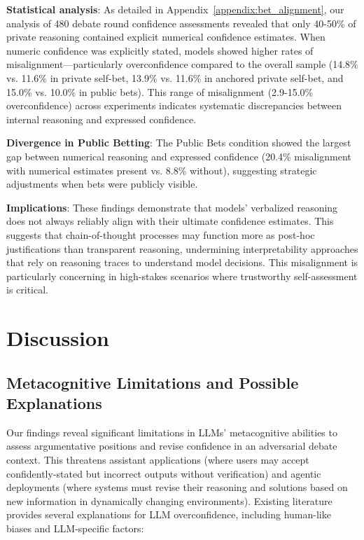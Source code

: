 \documentclass{article}
\begin{document}
\textbf{Statistical analysis}: As detailed in Appendix~\ref{appendix:bet_alignment}, our analysis of 480 debate round confidence assessments revealed that only 40-50\% of private reasoning contained explicit numerical confidence estimates. When numeric confidence was explicitly stated, models showed higher rates of misalignment—particularly overconfidence compared to the overall sample (14.8\% vs. 11.6\% in private self-bet, 13.9\% vs. 11.6\% in anchored private self-bet, and 15.0\% vs. 10.0\% in public bets). This range of misalignment (2.9-15.0\% overconfidence) across experiments indicates systematic discrepancies between internal reasoning 
and expressed confidence.

\textbf{Divergence in Public Betting}: The Public Bets condition showed the largest gap between numerical reasoning and expressed confidence (20.4\% misalignment with numerical estimates present vs. 8.8\% without), suggesting strategic adjustments when bets were publicly visible.

\textbf{Implications}: These findings demonstrate that models' verbalized reasoning does not always reliably align with their ultimate confidence estimates. This suggests that chain-of-thought processes may function more as post-hoc justifications than transparent reasoning, undermining interpretability approaches that rely on reasoning traces to understand model decisions. This misalignment is particularly concerning in high-stakes scenarios where trustworthy self-assessment is critical.

\section{Discussion}
\label{sec:discussion}

\subsection{Metacognitive Limitations and Possible Explanations}
\label{subsec:metacognitive_limitations}

Our findings reveal significant limitations in LLMs' metacognitive abilities to assess argumentative positions and revise confidence in an adversarial debate context. This threatens assistant applications (where users may accept confidently-stated but incorrect outputs without verification) and agentic deployments (where systems must revise their reasoning and solutions based on new information in dynamically changing environments). Existing literature provides several explanations for LLM overconfidence, including human-like biases and LLM-specific factors:
\end{document}

